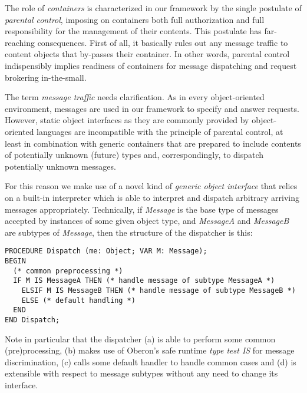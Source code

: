 
The role of {\em containers\/} is characterized in our framework by the single
postulate of {\em parental control}, imposing on containers both full
authorization and full responsibility for the management of their contents.
This postulate has far-reaching consequences. First of all, it basically rules
out any message traffic to content objects that by-passes their container.
In other words, parental control indispensibly implies readiness of containers
for message dispatching and request brokering in-the-small.

\ein
The term {\em message traffic\/} needs clarification.
As in every object-oriented environment, messages are used in our framework
to specify and answer requests. However, static object interfaces as they
are commonly provided by object-oriented languages are incompatible
with the principle of parental control, at least in combination with generic
containers that are prepared to include contents of potentially unknown
(future) types and, correspondingly, to dispatch potentially unknown messages.

\ein
For this reason we make use of a novel kind of {\em generic object
interface\/}
that relies on a built-in interpreter which is able to interpret and dispatch
arbitrary arriving messages appropriately. Technically, if {\em Message} is
the base type of messages accepted by instances of some given object type,
and {\em MessageA\/} and {\em MessageB\/} are subtypes of {\em Message},
then the structure of the dispatcher is this:

{\small\begin{verbatim}
PROCEDURE Dispatch (me: Object; VAR M: Message);
BEGIN
  (* common preprocessing *)
  IF M IS MessageA THEN (* handle message of subtype MessageA *)
    ELSIF M IS MessageB THEN (* handle message of subtype MessageB *)
    ELSE (* default handling *)
  END
END Dispatch;
\end{verbatim}}

Note in particular that the dispatcher (a) is able to perform some common
(pre)pro\-cessing, (b) makes use of Oberon's safe runtime {\em type test
IS\/} for message discrimination, (c) calls some default handler to handle
common cases and (d) is extensible with respect to message subtypes
without any need to change its interface.

